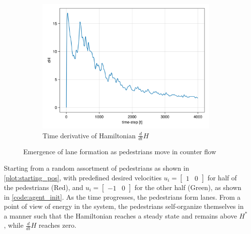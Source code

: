 \begin{itemize}
\begin{figure}[H]
\begin{subfigure}{.40\textwidth}
            \includegraphics[width=\linewidth]{figures/dH_counter.png}
            \caption{Time derivative of Hamiltonian $\frac{d}{dt}H$}
            \label{plot:counter_dh}
        \end{subfigure}
        \caption{Emergence of lane formation as pedestrians move in counter flow}
        \label{plot:counter}
    \end{figure}
Starting from a random assortment of pedestrians as shown in \autoref{plot:starting_pos}, with predefined desired velocities $u_i = \begin{bmatrix} 1 & 0 \end{bmatrix}$ for half of the pedestrians (Red), and $u_i = \begin{bmatrix} -1 & 0 \end{bmatrix}$ for the other half (Green), as shown in \autoref{code:agent_init}. As the time progresses, the pedestrians form lanes. From a point of view of energy in the system, the pedestrians self-organize themselves in a manner such that the Hamiltonian reaches a steady state and remains above $H^*$, while $\frac{d}{dt}H$ reaches zero. 


\end{itemize}
